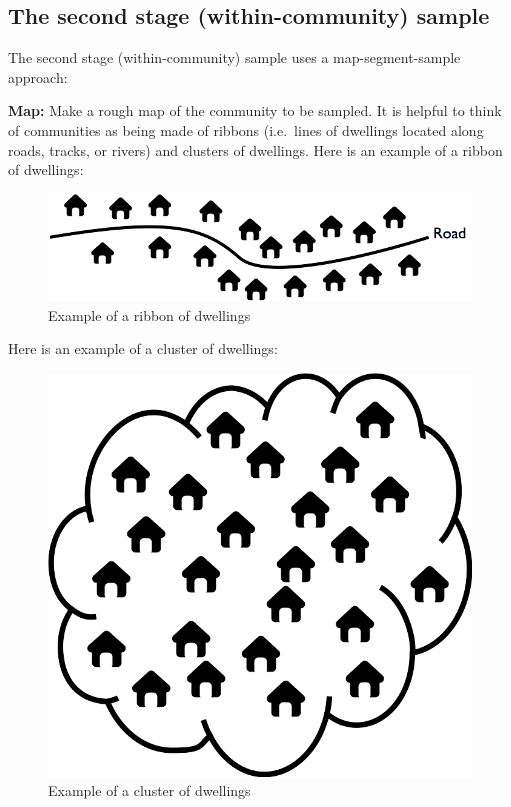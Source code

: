 \documentclass[12pt,]{book}
\theoremstyle{definition}
\theoremstyle{definition}
\theoremstyle{definition}
\theoremstyle{remark}
\begin{document}
\hypertarget{the-second-stage-within-community-sample}{%
\subsection{The second stage (within-community)
sample}\label{the-second-stage-within-community-sample}}

The second stage (within-community) sample uses a map-segment-sample
approach:

\textbf{Map:} Make a rough map of the community to be sampled. It is
helpful to think of communities as being made of ribbons (i.e.~lines of
dwellings located along roads, tracks, or rivers) and clusters of
dwellings. Here is an example of a ribbon of dwellings:

\begin{figure}[h]

{\centering \includegraphics[width=9.72in]{figures/stage2sample1} 

}

\caption{Example of a ribbon of dwellings}\label{fig:sample10}
\end{figure}

Here is an example of a cluster of dwellings:

\begin{figure}[h]

{\centering \includegraphics[width=9.72in]{figures/stage2sample2} 

}

\caption{Example of a cluster of dwellings}\label{fig:sample11}
\end{figure}
\end{document}
